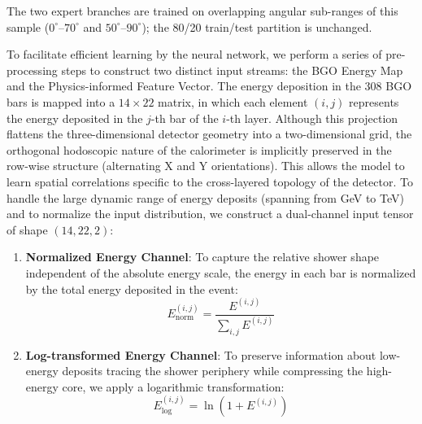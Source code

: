 \documentclass[preprint,12pt]{elsarticle}
\begin{document}
The two expert branches are trained on overlapping angular sub-ranges of
this sample ($0^{\circ}$--$70^{\circ}$ and $50^{\circ}$--$90^{\circ}$);
the 80/20 train/test partition is unchanged.

To facilitate efficient learning by the neural network, we perform a series of pre-processing steps to construct two distinct input streams: the BGO Energy Map and the Physics-informed Feature Vector. The energy deposition in the 308 BGO bars is mapped into a $14 \times 22$ matrix, in which each element $(i, j)$ represents the energy deposited in the $j$-th bar of the $i$-th layer. Although this projection flattens the three-dimensional detector geometry into a two-dimensional grid, the orthogonal hodoscopic nature of the calorimeter is implicitly preserved in the row-wise structure (alternating X and Y orientations). This allows the model to learn spatial correlations specific to the cross-layered topology of the detector. To handle the large dynamic range of energy deposits (spanning from GeV to TeV) and to normalize the input distribution, we construct a dual-channel input tensor of shape $(14, 22, 2)$:
\begin{enumerate}
    \item \textbf{Normalized Energy Channel}: To capture the relative shower shape independent of the absolute energy scale, the energy in each bar is normalized by the total energy deposited in the event:
    \begin{equation}
    E_{\text{norm}}^{(i,j)} = \frac{E^{(i,j)}}{\sum_{i,j} E^{(i,j)}}
    \end{equation}
    \item \textbf{Log-transformed Energy Channel}: To preserve information about low-energy deposits tracing the shower periphery while compressing the high-energy core, we apply a logarithmic transformation:
    \begin{equation}
    E_{\text{log}}^{(i,j)} = \ln(1 + E^{(i,j)})
    \end{equation}
\end{enumerate}
\end{document}

